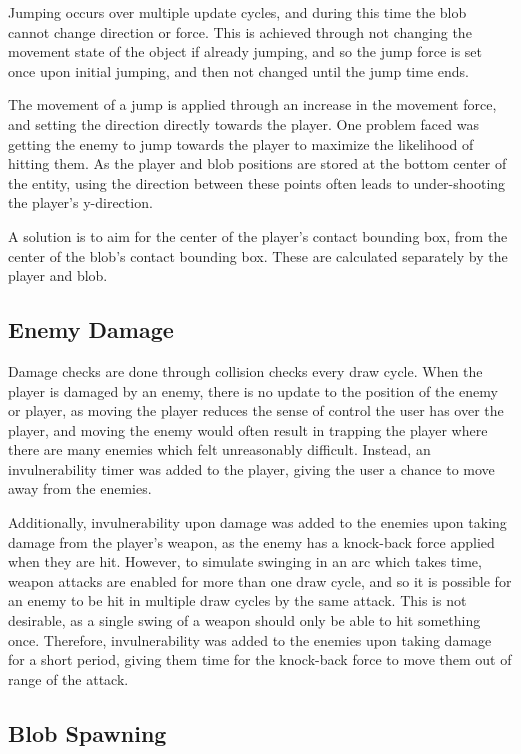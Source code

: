 \documentclass[a4paper, 12pt]{article}
\begin{document}
Jumping occurs over multiple update cycles, and during this time the blob cannot change direction or force. This is achieved through not changing the movement state of the object if already jumping, and so the jump force is set once upon initial jumping, and then not changed until the jump time ends.

The movement of a jump is applied through an increase in the movement force, and setting the direction directly towards the player. One problem faced was getting the enemy to jump towards the player to maximize the likelihood of hitting them. As the player and blob positions are stored at the bottom center of the entity, using the direction between these points often leads to under-shooting the player's y-direction.

A solution is to aim for the center of the player's contact bounding box, from the center of the blob's contact bounding box. These are calculated separately by the player and blob.

\subsection{Enemy Damage}

Damage checks are done through collision checks every draw cycle. When the player is damaged by an enemy, there is no update to the position of the enemy or player, as moving the player reduces the sense of control the user has over the player, and moving the enemy would often result in trapping the player where there are many enemies which felt unreasonably difficult. Instead, an invulnerability timer was added to the player, giving the user a chance to move away from the enemies.

Additionally, invulnerability upon damage was added to the enemies upon taking damage from the player's weapon, as the enemy has a knock-back force applied when they are hit. However, to simulate swinging in an arc which takes time, weapon attacks are enabled for more than one draw cycle, and so it is possible for an enemy to be hit in multiple draw cycles by the same attack. This is not desirable, as a single swing of a weapon should only be able to hit something once. Therefore, invulnerability was added to the enemies upon taking damage for a short period, giving them time for the knock-back force to move them out of range of the attack.

\subsection{Blob Spawning}
\end{document}
